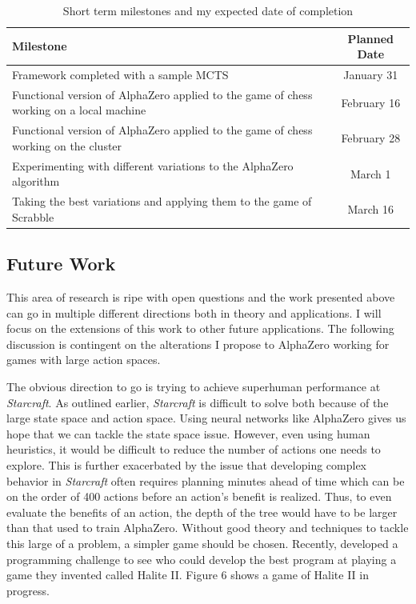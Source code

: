 \documentclass{article}
\begin{document}
  \begin{table}[H]
    \caption{Short term milestones and my expected date of completion}
    \begin{center}
      \begin{tabular}{| p{} | c |}
        \hline
        Milestone & Planned Date \\
        \hline
        Framework completed with a sample MCTS & January 31 \\
        \hline
        Functional version of AlphaZero applied to the game of chess working on a local machine & February 16 \\
        \hline
        Functional version of AlphaZero applied to the game of chess working on the cluster & February 28 \\
        \hline
        Experimenting with different variations to the AlphaZero algorithm & March 1 \\
        \hline
        Taking the best variations and applying them to the game of Scrabble & March 16 \\
        \hline
      \end{tabular}
    \end{center}
  \end{table}

  \subsection{Future Work}

  This area of research is ripe with open questions and the work presented above can go in multiple different directions both in theory and applications. I will focus on the extensions of this work to other future applications. The following discussion is contingent on the alterations I propose to AlphaZero working for games with large action spaces.

  The obvious direction to go is trying to achieve superhuman performance at \textit{Starcraft}. As outlined earlier, \textit{Starcraft} is difficult to solve both because of the large state space and action space. Using neural networks like AlphaZero gives us hope that we can tackle the state space issue. However, even using human heuristics, it would be difficult to reduce the number of actions one needs to explore. This is further exacerbated by the issue that developing complex behavior in \textit{Starcraft} often requires planning minutes ahead of time which can be on the order of 400 actions before an action's benefit is realized. Thus, to even evaluate the benefits of an action, the depth of the tree would have to be larger than that used to train AlphaZero. Without good theory and techniques to tackle this large of a problem, a simpler game should be chosen. Recently,  developed a programming challenge to see who could develop the best program at playing a game they invented called Halite II. Figure 6 shows a game of Halite II in progress.
\end{document}
